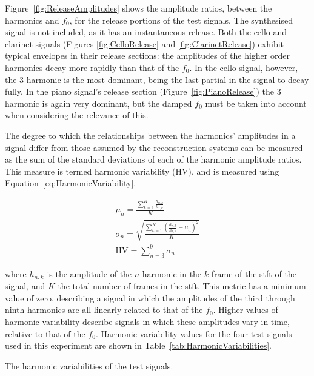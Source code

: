 		Figure~\ref{fig:ReleaseAmplitudes} shows the amplitude ratios, between the harmonics and $f_{0}$, for the
		release portions of the test signals. The synthesised signal is not included, as it has an instantaneous
		release. Both the cello and clarinet signals (Figures \ref{fig:CelloRelease} and \ref{fig:ClarinetRelease})
		exhibit typical envelopes in their release sections: the amplitudes of the higher order harmonics decay
		more rapidly than that of the $f_{0}$. In the cello signal, however, the 3 harmonic is the most
		dominant, being the last partial in the signal to decay fully. In the piano signal's release section
		(Figure~\ref{fig:PianoRelease}) the 3 harmonic is again very dominant, but the damped $f_{0}$
		must be taken into account when considering the relevance of this.

		The degree to which the relationships between the harmonics' amplitudes in a signal differ from those
		assumed by the reconstruction systems can be measured as the sum of the standard deviations of each of the
		harmonic amplitude ratios. This measure is termed harmonic variability ($\mathrm{HV}$), and is measured
		using Equation~\ref{eq:HarmonicVariability}. 		
		
		\begin{gather}
			\mu_{n} = \frac{\sum_{k = 1}^{K} \frac{h_{n,k}}{h_{1,k}}}{K} \nonumber \\
			\sigma_{n} = \sqrt{\frac{\sum_{k = 1}^{K} 
					         \left(\frac{h_{n,k}}{h_{1,k}} - \mu_{n} \right)^{2}}{K}} \nonumber \\
			\mathrm{HV} = \sum_{n = 3}^{9} \sigma_{n}
			\label{eq:HarmonicVariability}
		\end{gather}

		where $h_{n,k}$ is the amplitude of the $n$ harmonic in the $k$ frame of the
		\acrshort{stft} of the signal, and $K$ the total number of frames in the \acrshort{stft}. This metric has a
		minimum value of zero, describing a signal in which the amplitudes of the third through ninth harmonics are
		all linearly related to that of the $f_{0}$. Higher values of harmonic variability describe signals in
		which these amplitudes vary in time, relative to that of the $f_{0}$. Harmonic variability values for the
		four test signals used in this experiment are shown in Table~\ref{tab:HarmonicVariabilities}.

		\begin{table}[h!]
			\centering
			
			\caption{The harmonic variabilities of the test signals.}
			\label{tab:HarmonicVariabilities}
		\end{table}

